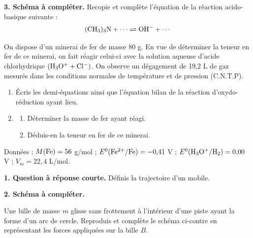 \documentclass[11pt]{article}
\begin{document}
\medskip
\noindent\textbf{3. Schéma à compléter.} Recopie et complète l'équation de la réaction acido-basique suivante :
\[ \mathrm{(CH_3)_3N} + \cdots \rightleftharpoons \mathrm{OH^-} + \cdots \]

On dispose d'un minerai de fer de masse 80 g. En vue de déterminer la teneur en fer de ce minerai, on fait réagir celui-ci avec la solution aqueuse d'acide chlorhydrique $(\mathrm{H_3O^+} + \mathrm{Cl^-})$. On observe un dégagement de 19,2 L de gaz mesurés dans les conditions normales de température et de pression (C.N.T.P).

\begin{enumerate}
  \item Écris les demi-équations ainsi que l'équation bilan de la réaction d'oxydo-réduction ayant lieu.
  \item \begin{enumerate}[label=\alph*.]
    \item Déterminer la masse de fer ayant réagi.
    \item Déduis-en la teneur en fer de ce minerai.
  \end{enumerate}
\end{enumerate}
\noindent Données : $M(\mathrm{Fe}) = 56$ g/mol ; $E^0(\mathrm{Fe^{2+}/Fe}) = -0{,}41$ V ; $E^0(\mathrm{H_3O^+/H_2}) = 0{,}00$ V ; $V_m = 22{,}4$ L/mol.



\noindent\textbf{1. Question à réponse courte.} Définis la trajectoire d'un mobile.

\medskip
\noindent\textbf{2. Schéma à compléter.}
\begin{minipage}{0.6\linewidth}
Une bille de masse $m$ glisse sans frottement à l'intérieur d'une piste ayant la forme d'un arc de cercle. Reproduis et complète le schéma ci-contre en représentant les forces appliquées sur la bille $B$.
\end{minipage}\hfill
\begin{minipage}{0.36\linewidth}
\centering
{}
\end{minipage}
\end{document}
